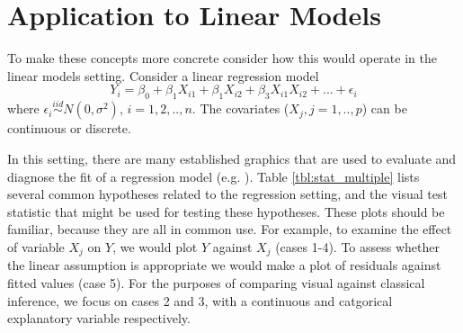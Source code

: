 \documentclass{article}
\begin{document}
%
%
%

\section{Application to Linear Models} \label{sec:regression}

To make these concepts more concrete consider how this would operate in the linear models setting. Consider a linear regression model 
\begin{equation}\label{multi} Y_i = \beta_0 + \beta_1 X_{i1} + \beta_1 X_{i2} + \beta_3 X_{i1}X_{i2} + ... + \epsilon_i 
\end{equation}
where $\epsilon_i \stackrel{iid}{ \sim } N(0,\sigma^2)$, $i=1,2, .., n$. The covariates ($X_j, j=1,..,p$) can be continuous or discrete.

In this setting, there are many established graphics that are used to evaluate and diagnose the fit of a regression model (e.g. \citet{cook:99}). Table \ref{tbl:stat_multiple} lists several common hypotheses related to the regression setting, and the visual test statistic that might be used for testing these hypotheses. These plots should be familiar, because they are all in common use. For example, to examine the effect of variable $X_j$ on $Y$, we would plot $Y$ against $X_j$ (cases 1-4). To assess whether the linear assumption is appropriate we would make a plot of residuals against fitted values (case 5). For the purposes of comparing visual against classical inference, we focus on cases 2 and 3, with a continuous and catgorical explanatory variable respectively. 
\end{document}
